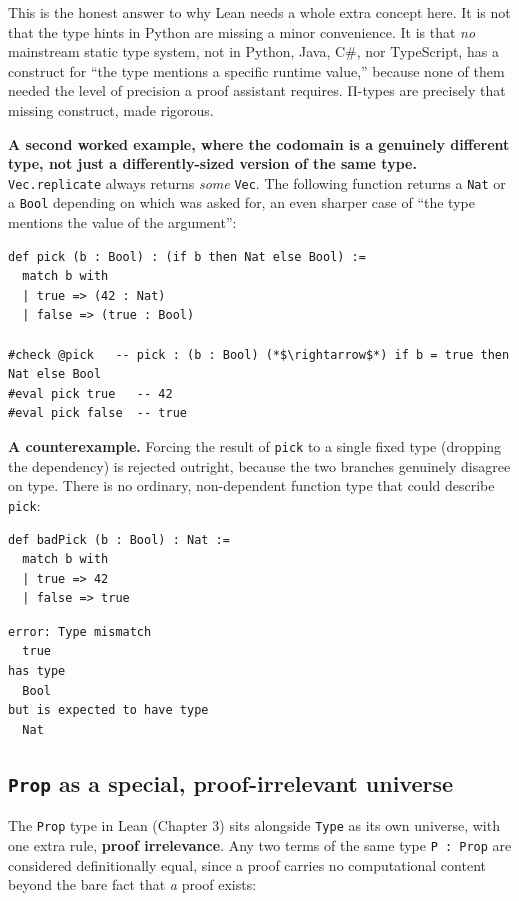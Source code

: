 This is the honest answer to why Lean needs a whole extra concept here. It is not that the type hints in Python are missing a minor convenience. It is that \emph{no} mainstream static type system, not in Python, Java, C\#, nor TypeScript, has a construct for ``the type mentions a specific runtime value,'' because none of them needed the level of precision a proof assistant requires. Π-types are precisely that missing construct, made rigorous.

\textbf{A second worked example, where the codomain is a genuinely different type, not just a differently-sized version of the same type.} \texttt{Vec.replicate} always returns \emph{some} \texttt{Vec}. The following function returns a \texttt{Nat} or a \texttt{Bool} depending on which was asked for, an even sharper case of ``the type mentions the value of the argument'':

\begin{lstlisting}
def pick (b : Bool) : (if b then Nat else Bool) :=
  match b with
  | true => (42 : Nat)
  | false => (true : Bool)

#check @pick   -- pick : (b : Bool) (*$\rightarrow$*) if b = true then Nat else Bool
#eval pick true   -- 42
#eval pick false  -- true
\end{lstlisting}

\textbf{A counterexample.} Forcing the result of \texttt{pick} to a single fixed type (dropping the dependency) is rejected outright, because the two branches genuinely disagree on type. There is no ordinary, non-dependent function type that could describe \texttt{pick}:

\begin{lstlisting}
def badPick (b : Bool) : Nat :=
  match b with
  | true => 42
  | false => true
\end{lstlisting}

\begin{lstlisting}
error: Type mismatch
  true
has type
  Bool
but is expected to have type
  Nat
\end{lstlisting}

\subsection{\texorpdfstring{\texttt{Prop} as a special, proof-irrelevant universe}{Prop as a special, proof-irrelevant universe}}\label{sec:01-basics:05-pi-sigma-and-coc:3}

The \texttt{Prop} type in Lean (Chapter 3) sits alongside \texttt{Type} as its own universe, with one extra rule, \textbf{proof irrelevance}. Any two terms of the same type \texttt{P : Prop} are considered definitionally equal, since a proof carries no computational content beyond the bare fact that \emph{a} proof exists:

